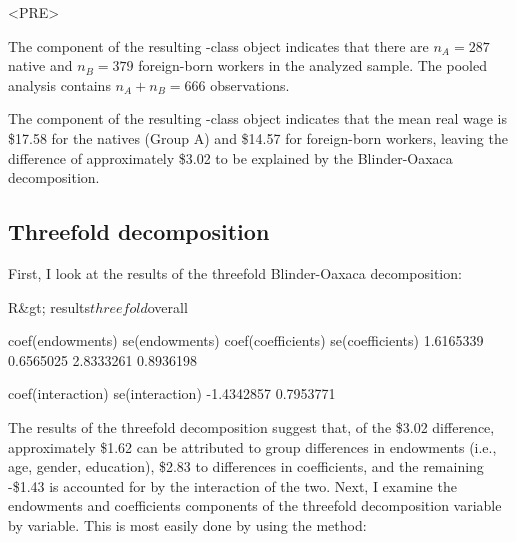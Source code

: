 <PRE>\documentclass[nojss]{jss}
\begin{document}


The  component of the resulting -class object indicates that there are $n_{A} = 287$ native and $n_{B} = 379$ foreign-born workers in the analyzed sample. The pooled analysis contains \mbox{$n_{A} + n_{B} = 666$} observations.

\newpage
{}


The  component of the resulting -class object indicates that the mean real wage is \$17.58 for the natives (Group A) and \$14.57 for foreign-born workers, leaving the difference of approximately \$3.02 to be explained by the Blinder-Oaxaca decomposition.

\subsection[Threefold decomposition]{Threefold decomposition}

First, I look at the results of the threefold Blinder-Oaxaca decomposition: 

\begin{CodeInput}
R&gt; results$threefold$overall
\end{CodeInput}

\begin{CodeOutput}
coef(endowments)     se(endowments) coef(coefficients)   se(coefficients)   
       1.6165339          0.6565025          2.8333261          0.8936198        
      
coef(interaction)    se(interaction)
      -1.4342857         0.7953771
\end{CodeOutput}
 
The results of the threefold decomposition suggest that, of the \$3.02 difference, approximately \$1.62 can be attributed to group differences in endowments (i.e., age, gender, education), \$2.83 to differences in coefficients, and the remaining -\$1.43 is accounted for by the interaction of the two. Next, I examine the endowments and coefficients components of the threefold decomposition variable by variable. This is most easily done by using the  method:
\end{document}
